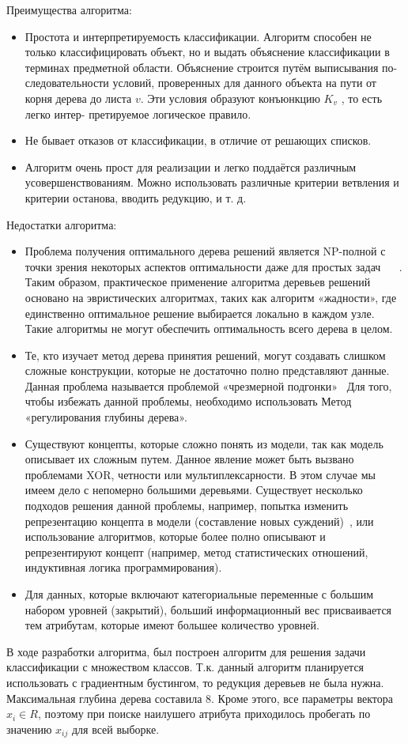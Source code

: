 Преимущества алгоритма:

\begin{itemize}
  \item Простота и интерпретируемость классификации. Алгоритм способен
не только классифицировать объект, но и выдать объяснение классификации
в терминах предметной области. Объяснение строится путём выписывания по-
следовательности условий, проверенных для данного объекта на пути от корня
дерева до листа $v$. Эти условия образуют конъюнкцию $K_v$ , то есть легко интер-
претируемое логическое правило.
  \item Не бывает отказов от классификации, в отличие от решающих списков.
  \item  Алгоритм очень прост для реализации и легко поддаётся различным усовершенствованиям. Можно использовать различные критерии ветвления и критерии останова, вводить редукцию, и т. д.
 \end{itemize}

Недостатки алгоритма:

\begin{itemize}
  \item Проблема получения оптимального дерева решений является NP-полной с точки зрения некоторых аспектов оптимальности даже для простых задач ~\cite{cart_optimal1} ~\cite{cart_optimal2}. Таким образом, практическое применение алгоритма деревьев решений основано на эвристических алгоритмах, таких как алгоритм «жадности», где единственно оптимальное решение выбирается локально в каждом узле. Такие алгоритмы не могут обеспечить оптимальность всего дерева в целом.
  \item Те, кто изучает метод дерева принятия решений, могут создавать слишком сложные конструкции, которые не достаточно полно представляют данные. Данная проблема называется проблемой «чрезмерной подгонки»~\cite{cart_optimal3} Для того, чтобы избежать данной проблемы, необходимо использовать Метод «регулирования глубины дерева».
  \item Существуют концепты, которые сложно понять из модели, так как модель описывает их сложным путем. Данное явление может быть вызвано проблемами XOR, четности или мультиплексарности. В этом случае мы имеем дело с непомерно большими деревьями. Существует несколько подходов решения данной проблемы, например, попытка изменить репрезентацию концепта в модели (составление новых суждений)~\cite{cart_optimal4}, или использование алгоритмов, которые более полно описывают и репрезентируют концепт (например, метод статистических отношений, индуктивная логика программирования).
  \item Для данных, которые включают категориальные переменные с большим набором уровней (закрытий), больший информационный вес присваивается тем атрибутам, которые имеют большее количество уровней.~\cite{cart_optimal5}
 \end{itemize}

В ходе разработки алгоритма, был построен алгоритм для решения задачи классификации с множеством классов. Т.к. данный алгоритм планируется использовать с градиентным бустингом, то редукция деревьев не была нужна. Максимальная глубина дерева составила 8. Кроме этого, все параметры вектора $x_i \in R$, поэтому при поиске наилушего атрибута приходилось пробегать по значению $x_{ij}$ для всей выборке. 